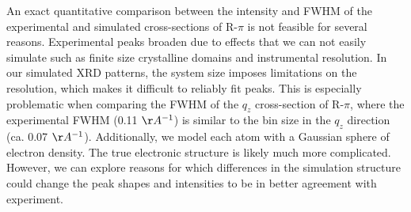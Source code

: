 \documentclass[journal=jpcbfk,manuscript=article]{achemso}
\begin{document}
  An exact quantitative comparison between the intensity and FWHM of the experimental
  and simulated cross-sections of R-$\pi$ is not feasible
  for several reasons. Experimental peaks broaden due to effects that we can not 
  easily simulate such as finite size crystalline domains and instrumental resolution.
  In our simulated XRD patterns, the system size imposes limitations on the resolution,
  which makes it difficult to reliably fit peaks. This is especially problematic when
  comparing the FWHM of the $q_z$ cross-section of R-$\pi$, where the experimental 
  FWHM (0.11 $\AA^{-1}$) is similar to the bin size in the $q_z$ direction (ca. 0.07 $\AA^{-1}$).
  Additionally, we model each atom with a Gaussian sphere of electron density. 
  The true electronic structure is likely much more complicated. However, we can
  explore reasons for which differences in the simulation structure could change
  the peak shapes and intensities to be in better agreement with experiment.
  

   
\end{document}
